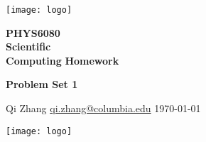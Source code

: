 \pagecolor{white}\afterpage{\nopagecolor}

\texttt{[image: logo]}
\vspace{1.5in}

\begin{singlespace}
    \fontsize{60}{65}\selectfont \textcolor{CUBlueDarkest}{\textbf{PHYS6080\\ Scientific\\ Computing}}
    \fontsize{40}{44}\selectfont \textcolor{CUBlueDarkest}{\textbf{Homework}}

    \vspace{10mm}
    \LARGE\textcolor{CUBlueDarkest}{\textbf{Problem Set 1}}

    \vspace{0.5in}
    \Large\textcolor{CUBlueDarkest}{Qi Zhang}
    \vspace{0.2in}
    \Large\textcolor{CUBlueDarkest}{\href{mailto:qi.zhang@columbia.edu}{qi.zhang@columbia.edu}}
    \vspace{0.2in}
    \Large\textcolor{CUBlueDarkest}{\today}

    \vspace{1in}
    \texttt{[image: logo]}
\end{singlespace}

\thispagestyle{empty}
\restoregeometry
\newpage
